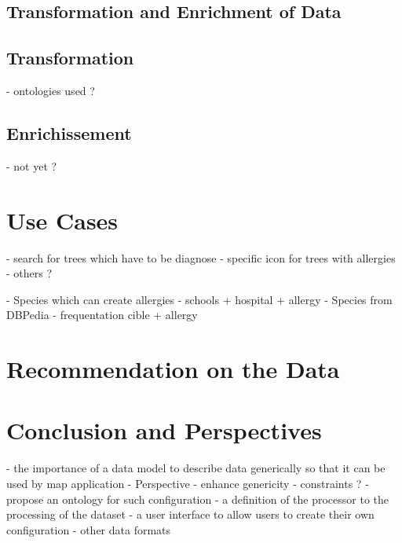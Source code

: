 \documentclass[a4paper,pagenum,english]{rnti}
\begin{document}
\subsection{Transformation and Enrichment of Data}

\subsection{Transformation}
- ontologies used ?

\subsection{Enrichissement}
	- not yet ?

\section{Use Cases}
- search for trees which have to be diagnose
- specific icon for trees with allergies
- others ?

- Species which can create allergies
- schools + hospital + allergy
- Species from DBPedia
- frequentation cible + allergy

\section{Recommendation on the Data}




\section{Conclusion and Perspectives}

- the importance of a data model to describe data generically so that it can be used by map application
	- Perspective
		- enhance genericity
			- constraints ?
	- propose an ontology for such configuration
	- a definition of the processor to the processing of the dataset
	- a user interface to allow users to create their own configuration	
	- other data formats
	



\end{document}
